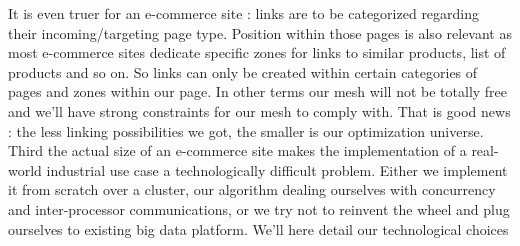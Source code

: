 \documentclass{iSWAGArticle}
\begin{document}
It is even truer for an e-commerce site : links are to be categorized regarding their incoming/targeting page type. Position within those pages
is also relevant as most e-commerce sites dedicate specific zones for links to similar products, list of products and so on.
So links can only be created within certain categories of pages and zones within our page. In other terms our mesh will not be totally free and 
we'll have strong constraints for our mesh to comply with. That is good news : the less linking possibilities we got, the smaller is our optimization universe.
\\
\indent
Third the actual size of an e-commerce site makes the implementation of a real-world industrial use case a technologically difficult problem.
Either we implement it from scratch over a cluster, our algorithm dealing ourselves with concurrency and inter-processor communications,
or we try not to reinvent the wheel and plug ourselves to existing big data platform. We'll here detail our technological choices
\end{document}
